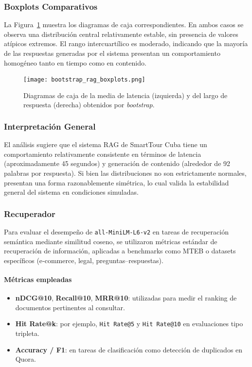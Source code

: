 \documentclass[runningheads]{llncs}
\begin{document}
\subsubsection{Boxplots Comparativos}

La Figura~\ref{fig:bootstrap_boxplots} muestra los diagramas de caja correspondientes. En ambos casos se observa una distribución central relativamente estable, sin presencia de valores atípicos extremos. El rango intercuartílico es moderado, indicando que la mayoría de las respuestas generadas por el sistema presentan un comportamiento homogéneo tanto en tiempo como en contenido.

\begin{figure}[H]
    \centering
    \texttt{[image: bootstrap\_rag\_boxplots.png]}
    \caption{Diagramas de caja de la media de latencia (izquierda) y del largo de respuesta (derecha) obtenidos por \textit{bootstrap}.}
    \label{fig:bootstrap_boxplots}
\end{figure}

\subsubsection{Interpretación General}

El análisis sugiere que el sistema RAG de SmartTour Cuba tiene un comportamiento relativamente consistente en términos de latencia (aproximadamente 45 segundos) y generación de contenido (alrededor de 92 palabras por respuesta). Si bien las distribuciones no son estrictamente normales, presentan una forma razonablemente simétrica, lo cual valida la estabilidad general del sistema en condiciones simuladas.

\subsubsection{Recuperador}

Para evaluar el desempeño de \texttt{all-MiniLM-L6-v2} en tareas de recuperación semántica mediante similitud coseno, se utilizaron métricas estándar de recuperación de información, aplicadas a benchmarks como MTEB o datasets específicos (e‑commerce, legal, preguntas–respuestas).

\paragraph{Métricas empleadas}
\begin{itemize}
  \item \textbf{nDCG@10}, \textbf{Recall@10}, \textbf{MRR@10}: utilizadas para medir el ranking de documentos pertinentes al consultar.
  \item \textbf{Hit Rate@k}: por ejemplo, \texttt{Hit Rate@5} y \texttt{Hit Rate@10} en evaluaciones tipo tripleta.
  \item \textbf{Accuracy / F1}: en tareas de clasificación como detección de duplicados en Quora.
\end{itemize}
\end{document}
